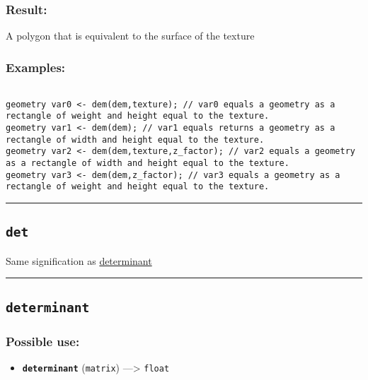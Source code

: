 \documentclass[]{book}
\providecommand{\tightlist}{%
  \setlength{\itemsep}{0pt}\setlength{\parskip}{0pt}}
\theoremstyle{definition}
\theoremstyle{definition}
\theoremstyle{definition}
\theoremstyle{remark}
\begin{document}
\subsubsection{Result:}\label{result-124}

A polygon that is equivalent to the surface of the texture

\subsubsection{Examples:}\label{examples-98}

\begin{verbatim}
 
geometry var0 <- dem(dem,texture); // var0 equals a geometry as a rectangle of weight and height equal to the texture. 
geometry var1 <- dem(dem); // var1 equals returns a geometry as a rectangle of width and height equal to the texture. 
geometry var2 <- dem(dem,texture,z_factor); // var2 equals a geometry as a rectangle of width and height equal to the texture. 
geometry var3 <- dem(dem,z_factor); // var3 equals a geometry as a rectangle of weight and height equal to the texture.
\end{verbatim}

\begin{center}\rule{0.5\linewidth}{\linethickness}\end{center}

\subsection{\texorpdfstring{\texttt{det}}{det}}\label{det}

Same signification as \href{OperatorsDH\#determinant}{determinant}

\begin{center}\rule{0.5\linewidth}{\linethickness}\end{center}

\subsection{\texorpdfstring{\texttt{determinant}}{determinant}}\label{determinant}

\subsubsection{Possible use:}\label{possible-use-129}

\begin{itemize}
\tightlist
\item
  \textbf{\texttt{determinant}} (\texttt{matrix}) ---\textgreater{}
  \texttt{float}
\end{itemize}
\end{document}
